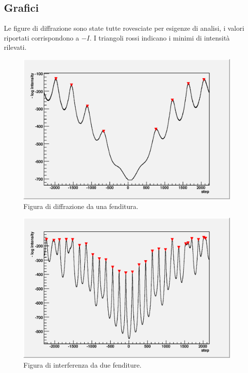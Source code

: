 \documentclass[italian,a4paper]{article}
\begin{document}
\subsection*{Grafici}
Le figure di diffrazione sono state tutte rovesciate per esigenze di analisi, i valori riportati corrispondono a $-I$. I triangoli rossi indicano i minimi di intensità rilevati.
\begin{figure}[!h]\centering
\includegraphics[scale=.6]{1slit.outint.eps}
\caption{Figura di diffrazione da una fenditura.}\label{1slitint}
\end{figure}
\begin{figure}[!h]\centering
\includegraphics[scale=.6]{2slits.outint.eps}
\caption{Figura di interferenza da due fenditure.}\label{2slitsint}
\end{figure}
\end{document}
